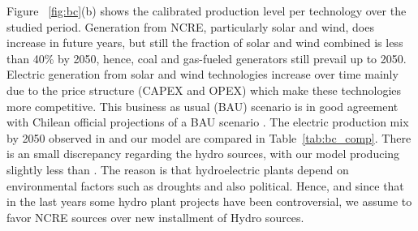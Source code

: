 \documentclass[11pt, letterpaper]{article}
\begin{document}
Figure ~\ref{fig:bc}(b) shows the calibrated production level per technology over the studied period. Generation from NCRE, particularly solar and wind, does increase in future years, but still the fraction of solar and wind combined is less than 40\% by 2050, hence, coal and gas-fueled generators still prevail up to 2050. Electric generation from solar and wind technologies increase over time mainly due to the price structure (CAPEX and OPEX) which make these technologies more competitive. This business as usual (BAU) scenario is in good agreement with Chilean official projections of a BAU scenario \cite{HojadeRuta}. The electric production mix by 2050 observed in \cite{HojadeRuta} and our model are compared in Table~\ref{tab:bc_comp}. There is an small discrepancy regarding the hydro sources, with our model producing slightly less than \cite{HojadeRuta}. The reason is that hydroelectric plants depend on environmental factors such as droughts and also political. Hence, and since that in the last years some hydro plant projects have been controversial, we assume to favor NCRE sources over new installment of Hydro sources. 


\end{document}

